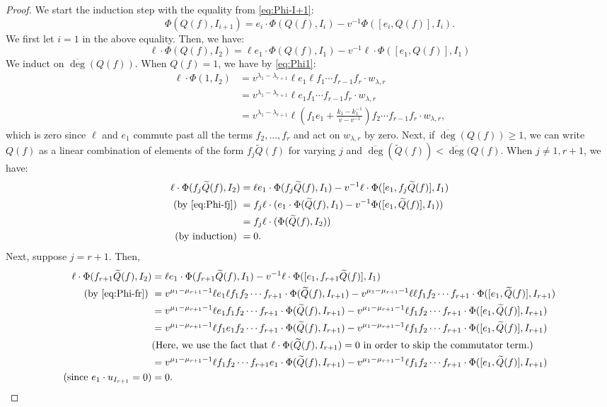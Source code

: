\documentclass{amsart}
\numberwithin{equation}{section}
\theoremstyle{theorem}
\theoremstyle{definition}
\newcommand{\ol}{\overline}
\begin{document}
\begin{proof}
We start the induction step with the equality from \eqref{eq:Phi-I+1}:
\[\Phi( Q(f),I_{i+1})=e_i\cdot \Phi( Q(f), I_i)-v^{-1}\Phi([e_i,Q(f)], I_{i}).\]
We first let $i=1$ in the above equality. Then, we have:
\[
\ell\cdot \Phi( Q(f),I_{2}) = \ell e_1\cdot \Phi( Q(f), I_1)-v^{-1}\ell\cdot \Phi([e_1,Q(f)], I_{1})
\]
We induct on $\ol{\deg}(Q(f))$. When $Q(f)=1$, we have by \eqref{eq:Phi1}: %
\begin{align*}\ell\cdot \Phi( 1,I_{2})&=v^{\lambda_1-\lambda_{r+1}}\ell e_1\ell f_1\cdots f_{r-1}f_r\cdot w_{\lambda, r}\\
&=v^{\lambda_1-\lambda_{r+1}}\ell e_1 f_1\cdots f_{r-1}f_r\cdot w_{\lambda, r}\\
&= v^{\lambda_1-\lambda_{r+1}}\ell \left(f_1e_1+\frac{k_1-k_1^{-1}}{v-v^{-1}}\right)f_2\cdots f_{r-1}f_r\cdot w_{\lambda, r},\end{align*}
which is zero since $\ell$ and $e_1$ commute past all the terms $f_2,\ldots, f_r$ and act on $w_{\lambda, r}$ by zero. Next, if $\ol\deg(Q(f))\geq 1$, we can write $Q(f)$ as a linear combination of elements of the form $f_{j}\widetilde Q(f)$ for varying $j$ and $\ol\deg(\widetilde Q(f))< \ol\deg(Q(f)$. When $j\neq 1, r+1$, we have:
\begin{align*}
\ell\cdot \Phi(f_j\widetilde Q(f),I_{2}) &= \ell e_1\cdot \Phi( f_j\widetilde Q(f), I_1)-v^{-1}\ell\cdot \Phi([e_1,f_j\widetilde Q(f)], I_{1})\\
\text{(by \eqref{eq:Phi-fj}) }&=f_j\ell\cdot( e_1\cdot \Phi( \widetilde Q(f), I_1)-v^{-1} \Phi([e_1,\widetilde Q(f)], I_{1}))\\
&=f_j\ell\cdot(\Phi(\widetilde{Q}(f),I_2))\\
\text{(by induction) }&=0.
\end{align*}
Next, suppose $j=r+1$. Then, 
\begin{align*}
\ell\cdot \Phi(f_{r+1}\widetilde Q(f),I_{2}) &= \ell e_1\cdot \Phi( f_{r+1}\widetilde Q(f), I_1)-v^{-1}\ell\cdot \Phi([e_1,f_{r+1}\widetilde Q(f)], I_{1})\\
\text{(by \eqref{eq:Phi-fr}) }&=v^{\mu_{1}-\mu_{r+1}-1}\ell e_1 \ell f_1f_2\cdots f_{r+1}\cdot \Phi( \widetilde Q(f), I_{r+1})-v^{\mu_{1}-\mu_{r+1}-1}\ell\ell f_1f_2\cdots f_{r+1}\cdot \Phi([e_1,\widetilde Q(f)], I_{r+1})\\
&=v^{\mu_{1}-\mu_{r+1}-1}\ell e_1 f_1f_2\cdots f_{r+1}\cdot \Phi( \widetilde Q(f), I_{r+1})-v^{\mu_{1}-\mu_{r+1}-1}\ell f_1f_2\cdots f_{r+1}\cdot \Phi([e_1,\widetilde Q(f)], I_{r+1})\\
&=v^{\mu_{1}-\mu_{r+1}-1}\ell f_1 e_1f_2\cdots f_{r+1}\cdot \Phi( \widetilde Q(f), I_{r+1})-v^{\mu_{1}-\mu_{r+1}-1}\ell f_1f_2\cdots f_{r+1}\cdot \Phi([e_1,\widetilde Q(f)], I_{r+1})\\
&\text{(Here, we use the fact that }\ell\cdot \Phi(\widetilde{Q}(f),I_{r+1})=0 \text{ in order to skip the commutator term}.)\\
&=v^{\mu_{1}-\mu_{r+1}-1}\ell f_1 f_2\cdots f_{r+1}e_1\cdot \Phi( \widetilde Q(f), I_{r+1})-v^{\mu_{1}-\mu_{r+1}-1}\ell f_1f_2\cdots f_{r+1}\cdot \Phi([e_1,\widetilde Q(f)], I_{r+1})\\
\text{(since $e_1\cdot u_{I_{r+1}}=0$)}&=0.
\end{align*}


\end{proof}
\end{document}
